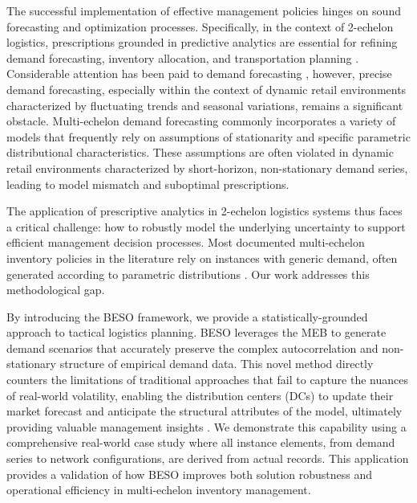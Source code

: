 \documentclass[poms,final,nonblindrev]{poms1_V1} %
\begin{document}
The successful implementation of effective management policies hinges on sound forecasting and optimization processes. Specifically, in the context of 2-echelon logistics, prescriptions grounded in predictive analytics are essential for refining demand forecasting, inventory allocation, and transportation planning \citep{A01,KK10}. Considerable attention has been paid to demand forecasting \citep{Ma15,Shenstone01}, however, precise demand forecasting, especially within the context of dynamic retail environments characterized by fluctuating trends and seasonal variations, remains a significant obstacle. Multi-echelon demand forecasting commonly incorporates a variety of models that frequently rely on assumptions of stationarity and specific parametric distributional characteristics. These assumptions are often violated in dynamic retail environments characterized by short-horizon, non-stationary demand series, leading to model mismatch and suboptimal prescriptions.

The application of prescriptive analytics in 2-echelon logistics systems thus faces a critical challenge: how to robustly model the underlying uncertainty to support efficient management decision processes. Most documented multi-echelon inventory policies in the literature rely on instances with generic demand, often generated according to parametric distributions \citep{Escorcia20,EG81}. Our work addresses this methodological gap.

By introducing the BESO framework, we provide a statistically-grounded approach to tactical logistics planning. BESO leverages the MEB to generate demand scenarios that accurately preserve the complex autocorrelation and non-stationary structure of empirical demand data. This novel method directly counters the limitations of traditional approaches that fail to capture the nuances of real-world volatility, enabling the distribution centers (DCs) to update their market forecast and anticipate the structural attributes of the model, ultimately providing valuable management insights \citep{P16}. We demonstrate this capability using a comprehensive real-world case study where all instance elements, from demand series to network configurations, are derived from actual records. This application provides a validation of how BESO improves both solution robustness and operational efficiency in multi-echelon inventory management.

\end{document}
